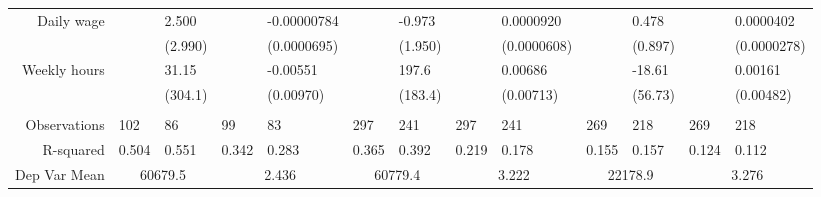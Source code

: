 \begin{tabular}{rrrrrrrrrrrrr}
Daily wage & \multicolumn{1}{l}{} & \multicolumn{1}{l}{2.500} & \multicolumn{1}{l}{} & \multicolumn{1}{l}{-0.00000784} & \multicolumn{1}{l}{} & \multicolumn{1}{l}{-0.973} & \multicolumn{1}{l}{} & \multicolumn{1}{l}{0.0000920} & \multicolumn{1}{l}{} & \multicolumn{1}{l}{0.478} & \multicolumn{1}{l}{} & \multicolumn{1}{l}{0.0000402} \\
      & \multicolumn{1}{l}{} & \multicolumn{1}{l}{(2.990)} & \multicolumn{1}{l}{} & \multicolumn{1}{l}{(0.0000695)} & \multicolumn{1}{l}{} & \multicolumn{1}{l}{(1.950)} & \multicolumn{1}{l}{} & \multicolumn{1}{l}{(0.0000608)} & \multicolumn{1}{l}{} & \multicolumn{1}{l}{(0.897)} & \multicolumn{1}{l}{} & \multicolumn{1}{l}{(0.0000278)} \\
Weekly hours & \multicolumn{1}{l}{} & \multicolumn{1}{l}{31.15} & \multicolumn{1}{l}{} & \multicolumn{1}{l}{-0.00551} & \multicolumn{1}{l}{} & \multicolumn{1}{l}{197.6} & \multicolumn{1}{l}{} & \multicolumn{1}{l}{0.00686} & \multicolumn{1}{l}{} & \multicolumn{1}{l}{-18.61} & \multicolumn{1}{l}{} & \multicolumn{1}{l}{0.00161} \\
      & \multicolumn{1}{l}{} & \multicolumn{1}{l}{(304.1)} & \multicolumn{1}{l}{} & \multicolumn{1}{l}{(0.00970)} & \multicolumn{1}{l}{} & \multicolumn{1}{l}{(183.4)} & \multicolumn{1}{l}{} & \multicolumn{1}{l}{(0.00713)} & \multicolumn{1}{l}{} & \multicolumn{1}{l}{(56.73)} & \multicolumn{1}{l}{} & \multicolumn{1}{l}{(0.00482)} \\
      & \multicolumn{1}{l}{} & \multicolumn{1}{l}{} & \multicolumn{1}{l}{} & \multicolumn{1}{l}{} & \multicolumn{1}{l}{} & \multicolumn{1}{l}{} & \multicolumn{1}{l}{} & \multicolumn{1}{l}{} & \multicolumn{1}{l}{} & \multicolumn{1}{l}{} & \multicolumn{1}{l}{} & \multicolumn{1}{l}{} \\
       \midrule
Observations & \multicolumn{1}{l}{102} & \multicolumn{1}{l}{86} & \multicolumn{1}{l}{99} & \multicolumn{1}{l}{83} & \multicolumn{1}{l}{297} & \multicolumn{1}{l}{241} & \multicolumn{1}{l}{297} & \multicolumn{1}{l}{241} & \multicolumn{1}{l}{269} & \multicolumn{1}{l}{218} & \multicolumn{1}{l}{269} & \multicolumn{1}{l}{218} \\
R-squared & \multicolumn{1}{l}{0.504} & \multicolumn{1}{l}{0.551} & \multicolumn{1}{l}{0.342} & \multicolumn{1}{l}{0.283} & \multicolumn{1}{l}{0.365} & \multicolumn{1}{l}{0.392} & \multicolumn{1}{l}{0.219} & \multicolumn{1}{l}{0.178} & \multicolumn{1}{l}{0.155} & \multicolumn{1}{l}{0.157} & \multicolumn{1}{l}{0.124} & \multicolumn{1}{l}{0.112} \\
Dep Var Mean & \multicolumn{2}{c}{60679.5} & \multicolumn{2}{c}{2.436} & \multicolumn{2}{c}{60779.4} & \multicolumn{2}{c}{3.222} & \multicolumn{2}{c}{22178.9} & \multicolumn{2}{c}{3.276} \\
\bottomrule
\end{tabular}%
